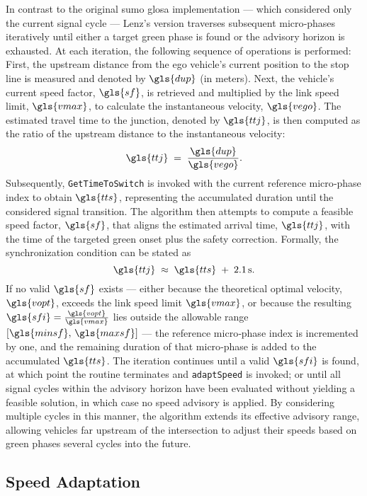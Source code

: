 In contrast to the original \ac{sumo} \ac{glosa} implementation --- which considered only the current signal cycle --- Lenz’s version traverses subsequent micro‐phases iteratively until either a target green phase is found or the advisory horizon is exhausted. At each iteration, the following sequence of operations is performed:
\mynewline
First, the upstream distance from the ego vehicle’s current position to the stop line is measured and denoted by $\gls{dup}$ (in meters). Next, the vehicle’s current speed factor, $\gls{sf}$, is retrieved and multiplied by the link speed limit, $\gls{vmax}$, to calculate the instantaneous velocity, $\gls{vego}$. The estimated travel time to the junction, denoted by $\gls{ttj}$, is then computed as the ratio of the upstream distance to the instantaneous velocity:
\begin{equation}
\gls{ttj} \;=\; \frac{\gls{dup}}{\gls{vego}}.
\end{equation}
Subsequently, \texttt{GetTimeToSwitch} is invoked with the current reference micro‐phase index to obtain $\gls{tts}$, representing the accumulated duration until the considered signal transition. The algorithm then attempts to compute a feasible speed factor, $\gls{sf}$, that aligns the estimated arrival time, $\gls{ttj}$, with the time of the targeted green onset plus the safety correction. Formally, the synchronization condition can be stated as
\begin{equation}
\gls{ttj} \;\approx\; \gls{tts} \;+\; 2.1\,\text{s}.
\end{equation}
If no valid $\gls{sf}$ exists --- either because the theoretical optimal velocity, $\gls{vopt}$, exceeds the link speed limit $\gls{vmax}$, or because the resulting $\gls{sfi} = \frac{\gls{vopt}}{\gls{vmax}}$ lies outside the allowable range $[\gls{minsf},\,\gls{maxsf}]$ --- the reference micro‐phase index is incremented by one, and the remaining duration of that micro‐phase is added to the accumulated $\gls{tts}$. The iteration continues until a valid $\gls{sfi}$ is found, at which point the routine terminates and \texttt{adaptSpeed} is invoked; or until all signal cycles within the advisory horizon have been evaluated without yielding a feasible solution, in which case no speed advisory is applied. By considering multiple cycles in this manner, the algorithm extends its effective advisory range, allowing vehicles far upstream of the intersection to adjust their speeds based on green phases several cycles into the future.

\subsection{Speed Adaptation}
\label{sec:Glosa_Speed_Adaptation}

